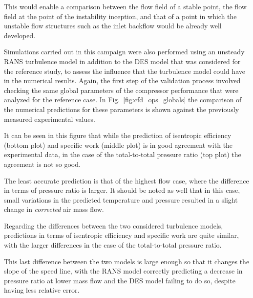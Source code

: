 This would enable a comparison between the flow field of a stable point, the flow field at the point of the instability inception, and that of a point in which the unstable flow structures such as the inlet backflow would be already well developed. 

Simulations carried out in this campaign were also performed using an unsteady RANS turbulence model in addition to the DES model that was considered for the reference study, to assess the influence that the turbulence model could have in the numerical results. Again, the first step of the validation process involved checking the same global parameters of the compressor performance that were analyzed for the reference case. In Fig.~\ref{fig:cfd_ops_globals} the comparison of the numerical predictions for these parameters is shown against the previously measured experimental values.  

It can be seen in this figure that while the prediction of isentropic efficiency (bottom plot) and specific work (middle plot) is in good agreement with the experimental data, in the case of the total-to-total pressure ratio (top plot) the agreement is not so good.

The least accurate prediction is that of the highest flow case, where the difference in terms of pressure ratio is larger. It should be noted as well that in this case, small variations in the predicted temperature and pressure resulted in a slight change in \textit{corrected} air mass flow.

Regarding the differences between the two considered turbulence models, predictions in terms of isentropic efficiency and specific work are quite similar, with the larger differences in the case of the total-to-total pressure ratio. 

This last difference between the two models is large enough so that it changes the slope of the speed line, with the RANS model correctly predicting a decrease in pressure ratio at lower mass flow and the DES model failing to do so, despite having less relative error.

